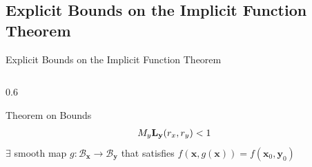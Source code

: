 \documentclass[11pt]{beamer}
\begin{document}
\begin{frame}{\section{Explicit Bounds on the Implicit Function Theorem}Explicit Bounds on the Implicit Function Theorem}
\begin{columns}
\begin{column}{0.6\textwidth}
\begin{block}{Theorem on Bounds}
\[{\begin{aligned}
                    M_y\mathbf{L}_\mathbf{y}(r_x,r_y) & < 1
                \end{aligned}}\vspace{-2mm}\]
                \(\exists\) smooth map \(g:\mathcal{B}_\mathbf{x}\to\mathcal{B}_\mathbf{y}\) that satisfies \(f(\mathbf{x},g(\mathbf{x})) = f(\mathbf{x}_0,\mathbf{y}_0)\)%
            \end{block}
        \end{column}
    \end{columns}
\end{frame}
\end{document}
